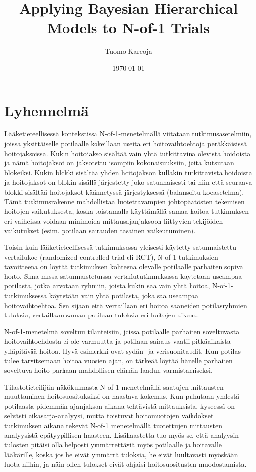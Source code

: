 \documentclass[12pt,a4paper,leqno]{report}
\title{Applying Bayesian Hierarchical Models to N-of-1 Trials}
\author{Tuomo Kareoja}
\date{\today}
\theoremstyle{plain}
\theoremstyle{definition}
\theoremstyle{remark}
\begin{document}
\maketitle

\chapter*{Lyhennelmä}\label{intro}

Lääketieteellisessä kontekstissa N-of-1-menetelmällä viitataan tutkimusasetelmiin,
joissa yksittäiselle potilaalle kokeillaan useita eri hoitovaihtoehtoja peräkkäisissä
hoitojaksoissa. Kukin hoitojakso sisältää vain yhtä tutkittavina olevista hoidoista ja
nämä hoitojaksot on jaksotettu isompiin kokonaisuuksiin, joita kutsutaan blokeiksi.
Kukin blokki sisältää yhden hoitojakson kullakin tutkittavista hoidoista ja hoitojaksot
on blokin sisällä järjestetty joko satunnaisesti tai niin että seuraava blokki sisältää
hoitojaksot käännetyssä järjestyksessä (balansoitu koeasetelma). Tämä tutkimusrakenne
mahdollistaa luotettavampien johtopäätösten tekemisen hoitojen vaikutuksesta, koska
toistamalla käyttämällä samaa hoitoa tutkimuksen eri vaiheissa voidaan minimoida
mittausajanjaksoon liittyvien tekijöiden vaikutukset (esim. potilaan sairauden tasainen
vaikeutuminen).

Toisin kuin lääketieteellisessä tutkimuksessa yleisesti käytetty satunnaistettu
vertailukoe (randomized controlled trial eli RCT), N-of-1-tutkimuksien tavoitteena on
löytää tutkimuksen kohteena olevalle potilaalle parhaiten sopiva hoito. Siinä missä
satunnaistetuissa vertailututkimuksissa käytetään useampaa potilasta, jotka arvotaan
ryhmiin, joista kukin saa vain yhtä hoitoa, N-of-1-tutkimuksessa käytetään vain yhtä
potilasta, joka saa useampaa hoitovaihtoehtoa. Sen sijaan että vertaillaan eri hoitoa
saaneiden potilasryhmien tuloksia, vertaillaan saman potilaan tuloksia eri hoitojen
aikana.

N-of-1-menetelmä soveltuu tilanteisiin, joissa potilaalle parhaiten soveltuvasta
hoitovaihtoehdosta ei ole varmuutta ja potilaan sairaus vaatii pitkäaikaista ylläpitävää
hoitoa. Hyvä esimerkki ovat sydän- ja verisuonitaudit. Kun potilas tulee tarvitsemaan
hoitoa vuosien ajan, on tärkeää löytää hänelle parhaiten soveltuva hoito parhaan
mahdollisen elämän laadun varmistamiseksi.

Tilastotieteilijän näkökulmasta N-of-1-menetelmällä saatujen mittausten muuttaminen
hoitosuosituksiksi on haastava kokemus. Kun puhutaan yhdestä potilaasta pidemmän
ajanjakson aikana tehtävistä mittauksista, kyseessä on selvästi aikasarja-analyysi,
mutta toistuvat hoitomuotojen vaihdokset tutkimuksen aikana tekevät N-of-1 menetelmällä
tuotettujen mittausten analyysistä epätyypillisen haasteen. Lisähaastetta tuo myös se,
että analyysin tulosten pitäisi olla helposti ymmärrettäviä myös potilaalle ja
hoitavalle lääkärille, koska jos he eivät ymmärrä tuloksia, he eivät luultavasti
myöskään luota niihin, ja näin ollen tulokset eivät ohjaisi hoitosuositusten
muodostamista.
\end{document}
